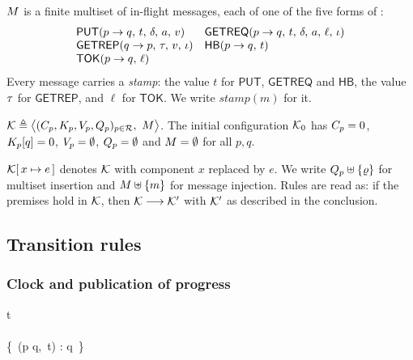 \begin{definition}[Messages]\label{def:messages}
$M$ is a finite multiset of in-flight messages, each of one of the five
forms of :
\[
\begin{array}{ll}
  \mathsf{PUT}(p \to q,\, t,\, \delta,\, a,\, v) &
  \mathsf{GETREQ}(p \to q,\, t,\, \delta,\, a,\, \ell,\, \iota) \\
  \mathsf{GETREP}(q \to p,\, \tau,\, v,\, \iota) &
  \mathsf{HB}(p \to q,\, t) \\
  \mathsf{TOK}(p \to q,\, \ell) &
\end{array}
\]
Every message carries a \emph{stamp}: the value $t$ for $\mathsf{PUT}$,
$\mathsf{GETREQ}$ and $\mathsf{HB}$, the value $\tau$ for $\mathsf{GETREP}$,
and $\ell$ for $\mathsf{TOK}$. We write $\mathit{stamp}(m)$ for it.
\end{definition}

\begin{definition}\label{def:configuration}
$\mathcal{K} \triangleq \bigl\langle (C_{p}, K_p, V_{p}, Q_{p})_{p \in \mathcal{R}},\
M \bigr\rangle$. The initial configuration $\mathcal{K}_0$ has $C_{p} = 0$,
$K_{p}[q] = 0$, $V_{p} = \emptyset$, $Q_{p} = \emptyset$ and
$M = \emptyset$ for all $p, q$.
\end{definition}

\begin{convention}\label{conv:rule-notation}
$\mathcal{K}[\,x \mapsto e\,]$ denotes $\mathcal{K}$ with component $x$ replaced by $e$. We
write $Q_{p} \uplus \{\varrho\}$ for multiset insertion and
$M \uplus \{m\}$ for message injection. Rules are read as: if the premises
hold in $\mathcal{K}$, then $\mathcal{K} \longrightarrow \mathcal{K}'$ with $\mathcal{K}'$ as described in the
conclusion.
\end{convention}

\subsection{Transition rules}
\label{sec:l1-rules}

\subsubsection*{Clock and publication of progress}

\begin{mathpar}
  {\clk{p} \mathrel{{:}{=}} t \\\\
   \Net \mathrel{{:}{=}} \Net \uplus
     \{\, (p \to q,\, t) : q \in {} \,\}}
\end{mathpar}

